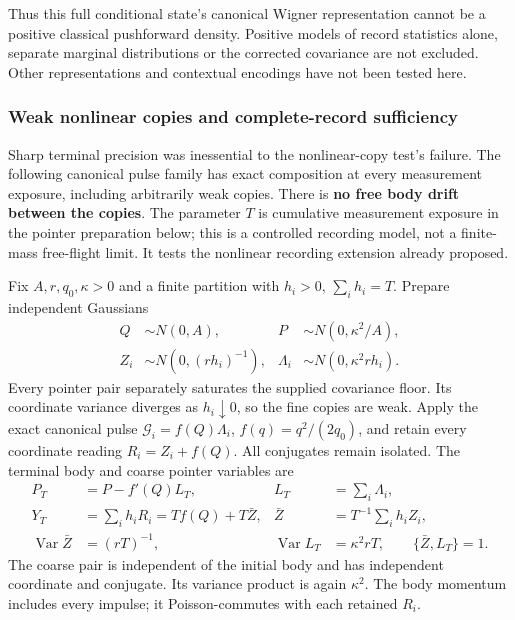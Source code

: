 \documentclass[11pt,a4paper]{article}
\begin{document}
Thus this full conditional state's canonical Wigner representation
cannot be a positive classical pushforward density. Positive models of
record statistics alone, separate marginal distributions or the
corrected covariance are not excluded. Other representations and
contextual encodings have not been tested here.

\hypertarget{weak-nonlinear-copies-and-complete-record-sufficiency}{%
\subsubsection{Weak nonlinear copies and complete-record
sufficiency}\label{weak-nonlinear-copies-and-complete-record-sufficiency}}

Sharp terminal precision was inessential to the nonlinear-copy test's
failure. The following canonical pulse family has exact composition at
every measurement exposure, including arbitrarily weak copies. There is
\textbf{no free body drift between the copies}. The parameter \(T\) is
cumulative measurement exposure in the pointer preparation below; this
is a controlled recording model, not a finite-mass free-flight limit. It
tests the nonlinear recording extension already proposed.

Fix \(A,r,q_0,\kappa>0\) and a finite partition with \(h_i>0\),
\(\sum_i h_i=T\). Prepare independent Gaussians \[\begin{aligned}
Q&\sim N(0,A),&P&\sim N(0,\kappa^2/A),\\
Z_i&\sim N(0,(rh_i)^{-1}),&
\Lambda_i&\sim N(0,\kappa^2rh_i).
\end{aligned}\] Every pointer pair separately saturates the supplied
covariance floor. Its coordinate variance diverges as
\(h_i\downarrow0\), so the fine copies are weak. Apply the exact
canonical pulse \(\mathcal G_i=f(Q)\Lambda_i\), \(f(q)=q^2/(2q_0)\), and
retain every coordinate reading \(R_i=Z_i+f(Q)\). All conjugates remain
isolated. The terminal body and coarse pointer variables are
\[\begin{aligned}
P_T&=P-f'(Q)L_T,&L_T&=\sum_i\Lambda_i,\\
Y_T&=\sum_i h_iR_i=T f(Q)+T\bar Z,&
\bar Z&=T^{-1}\sum_i h_iZ_i,\\
\operatorname{Var}\bar Z&=(rT)^{-1},&
\operatorname{Var}L_T&=\kappa^2rT,\qquad \{\bar Z,L_T\}=1.
\end{aligned}\tag{110}\] The coarse pair is independent of the initial
body and has independent coordinate and conjugate. Its variance product
is again \(\kappa^2\). The body momentum includes every impulse; it
Poisson-commutes with each retained \(R_i\).
\end{document}
